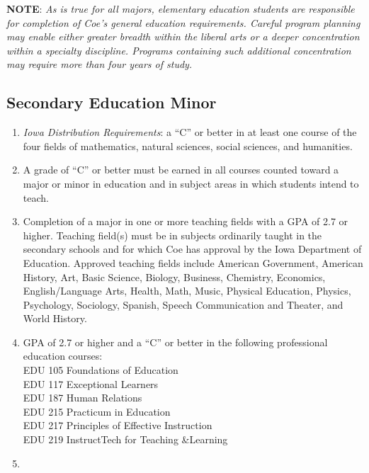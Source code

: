 \documentclass[
  letterpaper,
]{scrbook}
\providecommand{\tightlist}{%
  \setlength{\itemsep}{0pt}\setlength{\parskip}{0pt}}
\begin{document}
\textbf{NOTE}: \emph{As is true for all majors, elementary education
students are responsible for completion of Coe's general education
requirements. Careful program planning may enable either greater breadth
within the liberal arts or a deeper concentration within a specialty
discipline. Programs containing such additional concentration may
require more than four years of study.}

\subsection{Secondary Education Minor}\label{secondary-education-minor}

\begin{enumerate}
\def\labelenumi{\arabic{enumi}.}
\tightlist
\item
  \emph{Iowa Distribution Requirements}: a ``C'' or better in at least
  one course of the four fields of mathematics, natural sciences, social
  sciences, and humanities.\\
\item
  A grade of ``C'' or better must be earned in all courses counted
  toward a major or minor in education and in subject areas in which
  students intend to teach.\\
\item
  Completion of a major in one or more teaching fields with a GPA of 2.7
  or higher. Teaching field(s) must be in subjects ordinarily taught in
  the secondary schools and for which Coe has approval by the Iowa
  Department of Education. Approved teaching fields include American
  Government, American History, Art, Basic Science, Biology, Business,
  Chemistry, Economics, English/Language Arts, Health, Math, Music,
  Physical Education, Physics, Psychology, Sociology, Spanish, Speech
  Communication and Theater, and World History.\\
\item
  GPA of 2.7 or higher and a ``C'' or better in the following
  professional education courses:\\
  EDU 105 Foundations of Education\\
  EDU 117 Exceptional Learners\\
  EDU 187 Human Relations\\
  EDU 215 Practicum in Education\\
  EDU 217 Principles of Effective Instruction\\
  EDU 219 InstructTech for Teaching \&Learning\\
\item

\end{enumerate}
\end{document}
